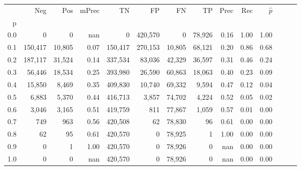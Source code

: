 \begin{tabular}{rrrrrrrrrrrrrr}
\toprule
{} &      Neg &     Pos & mPrec &       TN &       FP &      FN &      TP &  Prec &   Rec & $\hat{p}$ \\
p   &          &         &       &          &          &         &         &       &       &           \\
\midrule
0.0 &        0 &       0 &   nan &        0 &  420,570 &       0 &  78,926 &  0.16 &  1.00 &      1.00 \\
0.1 &  150,417 &  10,805 &  0.07 &  150,417 &  270,153 &  10,805 &  68,121 &  0.20 &  0.86 &      0.68 \\
0.2 &  187,117 &  31,524 &  0.14 &  337,534 &   83,036 &  42,329 &  36,597 &  0.31 &  0.46 &      0.24 \\
0.3 &   56,446 &  18,534 &  0.25 &  393,980 &   26,590 &  60,863 &  18,063 &  0.40 &  0.23 &      0.09 \\
0.4 &   15,850 &   8,469 &  0.35 &  409,830 &   10,740 &  69,332 &   9,594 &  0.47 &  0.12 &      0.04 \\
0.5 &    6,883 &   5,370 &  0.44 &  416,713 &    3,857 &  74,702 &   4,224 &  0.52 &  0.05 &      0.02 \\
0.6 &    3,046 &   3,165 &  0.51 &  419,759 &      811 &  77,867 &   1,059 &  0.57 &  0.01 &      0.00 \\
0.7 &      749 &     963 &  0.56 &  420,508 &       62 &  78,830 &      96 &  0.61 &  0.00 &      0.00 \\
0.8 &       62 &      95 &  0.61 &  420,570 &        0 &  78,925 &       1 &  1.00 &  0.00 &      0.00 \\
0.9 &        0 &       1 &  1.00 &  420,570 &        0 &  78,926 &       0 &   nan &  0.00 &      0.00 \\
1.0 &        0 &       0 &   nan &  420,570 &        0 &  78,926 &       0 &   nan &  0.00 &      0.00 \\
\bottomrule
\end{tabular}
